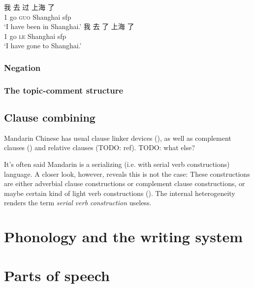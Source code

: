 \documentclass[UTF8, a4paper, oneside, scheme=plain]{ctexrep}
\newcommand*{\term}[1]{\emph{#1}}
\newcommand{\asis}[1]{\textsc{#1}}
\newcommand{\translate}[1]{`#1'}
\begin{document}
\begin{exe}
    \ex \begin{xlist}
        \ex \gll 我 去 过 上海 了 \\
        1 go \asis{guo} Shanghai \acs{sfp} \\
        \glt \translate{I have been in Shanghai.}
        \ex \gll 我 去 了 上海 了 \\
        1 go \asis{le} Shanghai \acs{sfp} \\
        \glt \translate{I have gone to Shanghai.}
    \end{xlist}
    \label{ex:quguo-qule}
\end{exe}

\subsection{Negation}



\subsection{The topic-comment structure}



\section{Clause combining}

Mandarin Chinese has usual clause linker devices (),
as well as complement clauses ()
and relative clauses (TODO: ref). TODO: what else?

It's often said Mandarin is a serializing (i.e. with serial verb constructions) language.
A closer look, however, reveals this is not the case:
These constructions are either adverbial clause constructions 
or complement clause constructions, 
or maybe certain kind of light verb constructions ().
The internal heterogeneity renders the term \term{serial verb construction} useless.

\chapter{Phonology and the writing system}

\chapter{Parts of speech}
\end{document}
